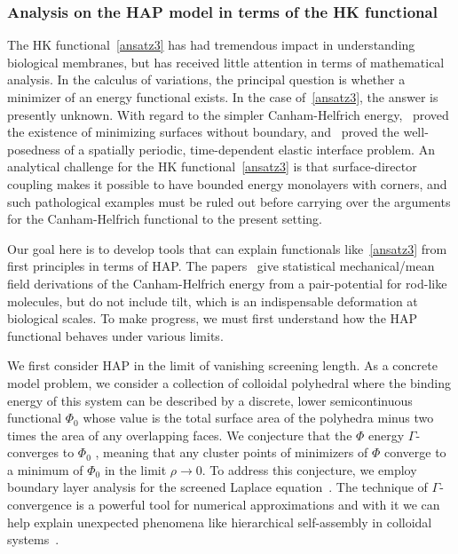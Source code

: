 \subsubsection{Analysis on the HAP model in terms of the HK functional}
The HK functional~\eqref{ansatz3} has had tremendous impact in
understanding biological membranes, but has received little attention in
terms of mathematical analysis. In the calculus of variations, the
principal question is whether a minimizer of an energy functional
exists. In the case of~\eqref{ansatz3}, the answer is presently unknown.
With regard to the simpler Canham-Helfrich energy,~\cite{Simon1993}
proved the existence of minimizing surfaces without boundary,
and~\cite{doi:10.1137/18M1195851} proved the well-posedness of a
spatially periodic, time-dependent elastic interface problem. An
analytical challenge for the HK functional~\eqref{ansatz3} is that
surface-director coupling makes it possible to have bounded energy
monolayers with corners, and such pathological examples must be ruled
out before carrying over the arguments for the Canham-Helfrich
functional to the present setting.

Our goal here is to develop tools that can explain functionals
like~\eqref{ansatz3} from first principles in terms of HAP. The
papers~\cite{doi:10.1063/5.0009734, Seguin2012, Seguin2014} give
statistical mechanical/mean field derivations of the Canham-Helfrich
energy from a pair-potential for rod-like molecules, but do not include
tilt, which is an indispensable deformation at biological scales. To
make progress, we must first understand how the HAP functional behaves
under various limits.

We first consider HAP in the limit of vanishing screening length. As a
concrete model problem, we consider a collection of colloidal polyhedral
where the binding energy of this system can be described by a discrete,
lower semicontinuous functional $\Phi_0$ whose value is the total
surface area of the polyhedra minus two times the area of any
overlapping faces. We conjecture that the $\Phi$ energy
$\Gamma$-converges to $\Phi_0$ \cite{Mugnai2013}, meaning that any
cluster points of minimizers of $\Phi$ converge to a minimum of $\Phi_0$
in the limit $\rho \to 0$. To address this conjecture, we employ
boundary layer analysis for the screened Laplace equation~\cite{Lee2018,
Lin2015, Shibata2004,1531-3492_2006_2_357, Lee2018}. The technique of
$\Gamma$-convergence is a powerful tool for numerical approximations and
with it we can help explain unexpected phenomena like hierarchical
self-assembly in colloidal systems~\cite{Luo2019}.

